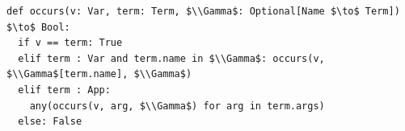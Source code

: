 \documentclass[border=10pt]{standalone}
\begin{document}
\begin{lstlisting}
def occurs(v: Var, term: Term, $\\Gamma$: Optional[Name $\to$ Term]) $\to$ Bool:
  if v == term: True
  elif term : Var and term.name in $\\Gamma$: occurs(v, $\\Gamma$[term.name], $\\Gamma$)
  elif term : App:
    any(occurs(v, arg, $\\Gamma$) for arg in term.args)
  else: False
\end{lstlisting}
\end{document}
